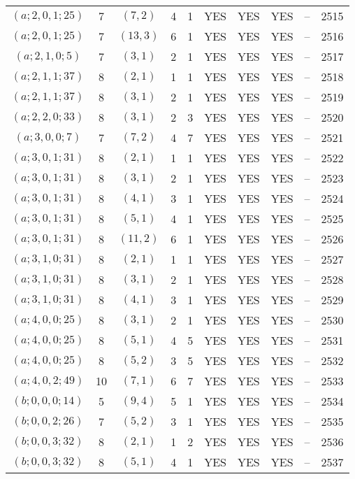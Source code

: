 \begin{longtable}{|c|c|c|c|c|c|c|c|c|c|}
$(a; 2, 0, 1; 25)$ & 7 & $(7, 2)$ & 4 & 1 & YES & YES & YES & -- & 2515\\
$(a; 2, 0, 1; 25)$ & 7 & $(13, 3)$ & 6 & 1 & YES & YES & YES & -- & 2516\\
$(a; 2, 1, 0; 5)$ & 7 & $(3, 1)$ & 2 & 1 & YES & YES & YES & -- & 2517\\
$(a; 2, 1, 1; 37)$ & 8 & $(2, 1)$ & 1 & 1 & YES & YES & YES & -- & 2518\\
$(a; 2, 1, 1; 37)$ & 8 & $(3, 1)$ & 2 & 1 & YES & YES & YES & -- & 2519\\
$(a; 2, 2, 0; 33)$ & 8 & $(3, 1)$ & 2 & 3 & YES & YES & YES & -- & 2520\\
$(a; 3, 0, 0; 7)$ & 7 & $(7, 2)$ & 4 & 7 & YES & YES & YES & -- & 2521\\
$(a; 3, 0, 1; 31)$ & 8 & $(2, 1)$ & 1 & 1 & YES & YES & YES & -- & 2522\\
$(a; 3, 0, 1; 31)$ & 8 & $(3, 1)$ & 2 & 1 & YES & YES & YES & -- & 2523\\
$(a; 3, 0, 1; 31)$ & 8 & $(4, 1)$ & 3 & 1 & YES & YES & YES & -- & 2524\\
$(a; 3, 0, 1; 31)$ & 8 & $(5, 1)$ & 4 & 1 & YES & YES & YES & -- & 2525\\
$(a; 3, 0, 1; 31)$ & 8 & $(11, 2)$ & 6 & 1 & YES & YES & YES & -- & 2526\\
$(a; 3, 1, 0; 31)$ & 8 & $(2, 1)$ & 1 & 1 & YES & YES & YES & -- & 2527\\
$(a; 3, 1, 0; 31)$ & 8 & $(3, 1)$ & 2 & 1 & YES & YES & YES & -- & 2528\\
$(a; 3, 1, 0; 31)$ & 8 & $(4, 1)$ & 3 & 1 & YES & YES & YES & -- & 2529\\
$(a; 4, 0, 0; 25)$ & 8 & $(3, 1)$ & 2 & 1 & YES & YES & YES & -- & 2530\\
$(a; 4, 0, 0; 25)$ & 8 & $(5, 1)$ & 4 & 5 & YES & YES & YES & -- & 2531\\
$(a; 4, 0, 0; 25)$ & 8 & $(5, 2)$ & 3 & 5 & YES & YES & YES & -- & 2532\\
$(a; 4, 0, 2; 49)$ & 10 & $(7, 1)$ & 6 & 7 & YES & YES & YES & -- & 2533\\
$(b; 0, 0, 0; 14)$ & 5 & $(9, 4)$ & 5 & 1 & YES & YES & YES & -- & 2534\\
$(b; 0, 0, 2; 26)$ & 7 & $(5, 2)$ & 3 & 1 & YES & YES & YES & -- & 2535\\
$(b; 0, 0, 3; 32)$ & 8 & $(2, 1)$ & 1 & 2 & YES & YES & YES & -- & 2536\\
$(b; 0, 0, 3; 32)$ & 8 & $(5, 1)$ & 4 & 1 & YES & YES & YES & -- & 2537\\

\end{longtable}
